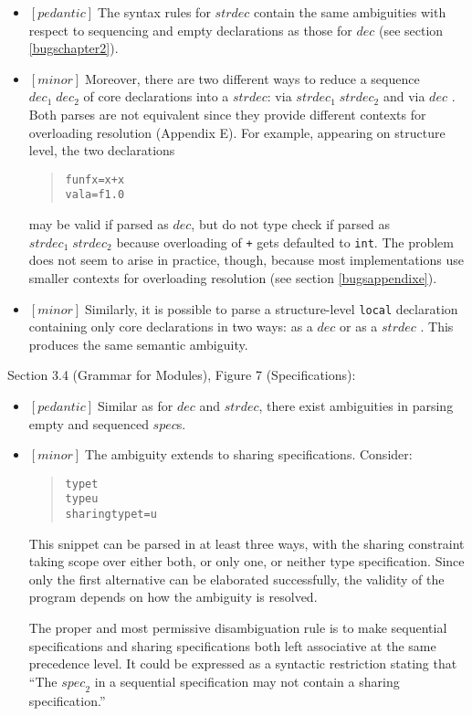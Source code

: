 \documentclass{article}
\newcommand{\m}[1]{$[\mathit{#1}]\;$}
\newcommand{\minor}{\m{minor}}
\newcommand{\pedantic}{\m{pedantic}}
\begin{document}
\begin{itemize}
\item \pedantic The syntax rules for $\mathit{strdec}$ contain the same ambiguities with respect to sequencing and empty declarations as those for $\mathit{dec}$ (see section \ref{bugschapter2}).

\item \minor Moreover, there are two different ways to reduce a sequence $\mathit{dec}_1\;\mathit{dec}_2$ of core declarations into a $\mathit{strdec}$: via $\mathit{strdec}_1\;\mathit{strdec}_2$ and via $\mathit{dec}$ \cite{mistakes}. Both parses are not equivalent since they provide different contexts for overloading resolution (Appendix E). For example, appearing on structure level, the two declarations
\begin{quote}
\begin{alltt}
fun f x = x + x
val a = f 1.0
\end{alltt}
\end{quote}
may be valid if parsed as $\mathit{dec}$, but do not type check if parsed as $\mathit{strdec}_1\;\mathit{strdec}_2$ because overloading of {\tt +} gets defaulted to {\tt int}. The problem does not seem to arise in practice, though, because most implementations use smaller contexts for overloading resolution (see section \ref{bugsappendixe}).

\item \minor Similarly, it is possible to parse a structure-level {\tt local} declaration containing only core declarations in two ways: as a $\mathit{dec}$ or as a $\mathit{strdec}$ \cite{mistakes}. This produces the same semantic ambiguity.
\end{itemize}


Section 3.4 (Grammar for Modules), Figure 7 (Specifications):
\nopagebreak

\begin{itemize}
\item \pedantic Similar as for $\mathit{dec}$ and $\mathit{strdec}$, there exist ambiguities in parsing empty and sequenced $\mathit{spec}$s.

\item \minor The ambiguity extends to sharing specifications. Consider:
\begin{quote}
\begin{alltt}
type t
type u
sharing type t = u
\end{alltt}
\end{quote}
This snippet can be parsed in at least three ways, with the sharing constraint taking scope over either both, or only one, or neither type specification. Since only the first alternative can be elaborated successfully, the validity of the program depends on how the ambiguity is resolved.

The proper and most permissive disambiguation rule is to make sequential specifications and sharing specifications both left associative at the same precedence level. It could be expressed as a syntactic restriction stating that ``The $\mathit{spec}_2$ in a sequential specification may not contain a sharing specification.''
\end{itemize}
\end{document}
